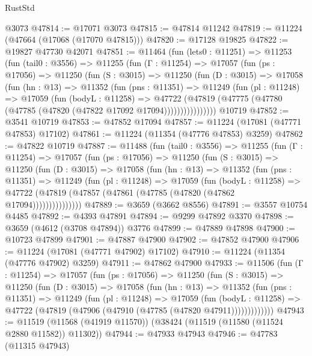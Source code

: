 \begin{lexlean}{RustStd}
\begin{coremodule}
    @3073
@47814 := @17071 @3073
@47815 := @47814 @11242
@47819 := @11224 (@47664 (@17068 (@17070 @47815)))
@47820 := @17128 @19825
@47822 := @19827 @47730 @42071
@47851 := @11464
    (fun (lets0 : @11251) =>
    @11253
      (fun (tail0 : @3556) =>
      @11255
        (fun (Γ : @11254) =>
        @17057
          (fun (ps : @17056) =>
          @11250
            (fun (S : @3015) =>
            @11250
              (fun (D : @3015) =>
              @17058
                (fun (hn : @13) =>
                @11352
                  (fun (pns : @11351) =>
                  @11249
                    (fun (pl : @11248) =>
                    @17059
                      (fun (bodyL : @11258) =>
                      @47722
                        (@47819
                          (@47775 (@47780 (@47785 (@47820 (@47822 @17092 @17094))))))))))))))))
    @10719
@47852 := @3541 @10719
@47853 := @47852 @17094
@47857 := @11224 (@17081 (@47771 @47853) @17102)
@47861 := @11224 (@11354 (@47776 @47853) @3259)
@47862 := @47822 @10719
@47887 := @11488
    (fun (tail0 : @3556) =>
    @11255
      (fun (Γ : @11254) =>
      @17057
        (fun (ps : @17056) =>
        @11250
          (fun (S : @3015) =>
          @11250
            (fun (D : @3015) =>
            @17058
              (fun (hn : @13) =>
              @11352
                (fun (pns : @11351) =>
                @11249
                  (fun (pl : @11248) =>
                  @17059
                    (fun (bodyL : @11258) =>
                    @47722 (@47819 (@47857 (@47861 (@47785 (@47820 (@47862 @17094)))))))))))))))
@47889 := @3659 (@3662 @8556)
@47891 := @3557 @10754 @4485
@47892 := @4393 @47891
@47894 := @9299 @47892 @3370
@47898 := @3659 (@4612 (@3708 @47894)) @3776
@47899 := @47889 @47898
@47900 := @10723 @47899
@47901 := @47887 @47900
@47902 := @47852 @47900
@47906 := @11224 (@17081 (@47771 @47902) @17102)
@47910 := @11224 (@11354 (@47776 @47902) @3259)
@47911 := @47862 @47900
@47933 := @11506
    (fun (Γ : @11254) =>
    @17057
      (fun (ps : @17056) =>
      @11250
        (fun (S : @3015) =>
        @11250
          (fun (D : @3015) =>
          @17058
            (fun (hn : @13) =>
            @11352
              (fun (pns : @11351) =>
              @11249
                (fun (pl : @11248) =>
                @17059
                  (fun (bodyL : @11258) =>
                  @47722 (@47819 (@47906 (@47910 (@47785 (@47820 @47911)))))))))))))
@47943 := @11519 (@11568 (@41919 @11570)) (@38424 (@11519 (@11580 (@11524 @2880 @11582)) @11302))
@47944 := @47933 @47943
@47946 := @47783 (@11315 @47943)

\end{coremodule}
\end{lexlean}
